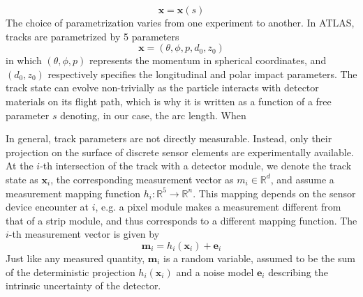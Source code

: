 \begin{equation}
    \label{11.1}
    \mathbf{x} = \mathbf{x}(s)
\end{equation}
The choice of parametrization varies from one experiment to another. In ATLAS, tracks are parametrized by 5 parameters
\begin{equation}
\label{11.2}
\mathbf{x} = (\theta, \phi, p, d_0, z_0)
\end{equation}
in which $(\theta, \phi, p)$ represents the momentum in spherical coordinates, and $(d_0, z_0)$ respectively specifies the longitudinal and polar impact parameters. The track state can evolve non-trivially as the particle interacts with detector materials on its flight path, which is why it is written as a function of a free parameter $s$ denoting, in our case, the arc length. When 

In general, track parameters are not directly measurable. 
Instead, only their projection on the surface of discrete sensor elements are experimentally available. At the $i$-th intersection of the track with a detector module, we denote the track state as $\mathbf{x}_i$, the corresponding measurement vector as $m_i\in \mathbb{R}^d$, and assume a measurement mapping function $h_i: \mathbb{R}^5\to \mathbb{R}^n$. This mapping depends on the sensor device encounter at $i$, e.g. a pixel module makes a measurement different from that of a strip module, and thus corresponds to a different mapping function. The $i$-th measurement vector is given by 
\begin{equation}
    \label{11.3}
    \mathbf{m}_i = h_i(\mathbf{x}_i) + \mathbf{e}_i
\end{equation}
Just like any measured quantity, $\mathbf{m}_i$ is a random variable, assumed to be the sum of the deterministic projection $h_i(\mathbf{x}_i)$ and a noise model $\mathbf{e}_i$ describing the intrinsic uncertainty of the detector. 

